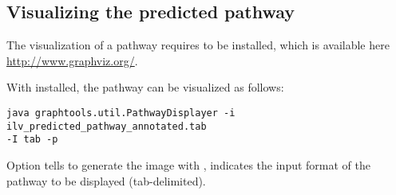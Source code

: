 \subsection{Visualizing the predicted pathway}\label{Visualize}

The visualization of a pathway requires  to be installed,
which is available here \url{http://www.graphviz.org/}.

With  installed, the pathway can be visualized as follows:

\begin{verbatim}
java graphtools.util.PathwayDisplayer -i ilv_predicted_pathway_annotated.tab 
-I tab -p
\end{verbatim}

Option  tells  to generate the image with
,  indicates the input format of the pathway to be
displayed (tab-delimited).

